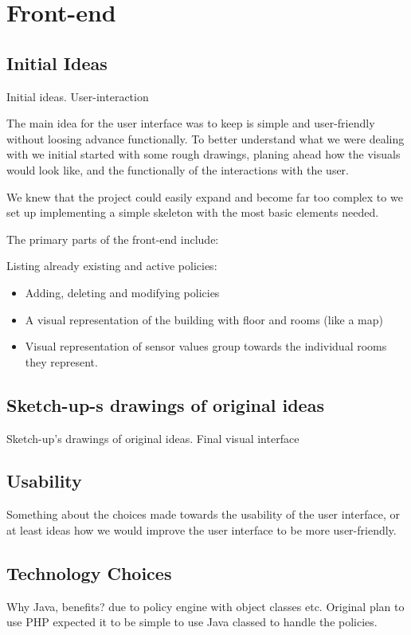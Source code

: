 \section{Front-end}
\subsection{Initial Ideas}
Initial ideas. User-interaction

The main idea for the user interface was to keep is simple and user-friendly without loosing advance functionally\cite{Krug:2005:DMM:1051204}. To better understand what we were dealing with we initial started with some rough drawings, planing ahead how the visuals would look like, and the functionally of the interactions with the user.

We knew that the project could easily expand and become far too complex to we set up implementing a simple skeleton with the most basic elements needed.

The primary parts of the front-end include:

Listing already existing and active policies:
\begin{itemize}
\item Adding, deleting and modifying policies
\item A visual representation of the building with floor and rooms (like a map)
\item Visual representation of sensor values group towards the individual rooms they represent.
\end{itemize}



\subsection{Sketch-up-s drawings of original ideas}

	Sketch-up's drawings of original ideas.
	Final visual interface
	

\subsection{Usability}
Something about the choices made towards the usability of the user interface, or at least ideas how we would improve the user interface to be more user-friendly.


\subsection{Technology Choices}
Why Java, benefits? due to policy engine with object classes etc. Original plan to use PHP expected it to be simple to use Java classed to handle the policies.
